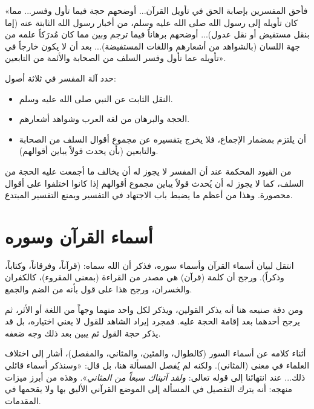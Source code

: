  «فأحق المفسرين بإصابة الحق في تأويل القرآن... أوضحهم حجة فيما تأول وفسر... مما كان تأويله إلى رسول الله صلى الله عليه وسلم، من أخبار رسول الله الثابتة عنه (إما بنقل مستفيض أو نقل عدول)... أوضحهم برهاناً فيما ترجم وبين مما كان مُدرَكاً علمه من جهة اللسان (بالشواهد من أشعارهم واللغات المستفيضة)... بعد أن لا يكون خارجاً في تأويله عما تأول وفسر السلف من الصحابة والأئمة من التابعين».

\begin{fawaid}
حدد  آلة المفسر في ثلاثة أصول:
\begin{itemize}
    \item النقل الثابت عن النبي صلى الله عليه وسلم.
    \item الحجة والبرهان من لغة العرب وشواهد أشعارهم.
    \item أن يلتزم بمضمار الإجماع، فلا يخرج بتفسيره عن مجموع أقوال السلف من الصحابة والتابعين (بأن يحدث قولاً يباين أقوالهم).
\end{itemize}
\end{fawaid}

\begin{fawaid}
من القيود المحكمة عند  أن المفسر لا يجوز له أن يخالف ما أجمعت عليه الحجة من السلف، كما لا يجوز له أن يُحدث قولاً يباين مجموع أقوالهم إذا كانوا اختلفوا على أقوال محصورة. وهذا من أعظم ما يضبط باب الاجتهاد في التفسير ويمنع التفسير المبتدع.
\end{fawaid}

\separator

\section{أسماء القرآن وسوره}
انتقل  لبيان أسماء القرآن وأسماء سوره، فذكر أن الله سماه: (قرآناً، وفرقاناً، وكتاباً، وذكراً).
ورجح أن كلمة (قرآن) هي مصدر من القراءة (بمعنى المقروء)، كالكفران والخسران، ورجح هذا على قول  بأنه من الضم والجمع.

ومن دقة صنيعه هنا أنه يذكر القولين، ويذكر لكل واحد منهما وجهاً من اللغة أو الأثر، ثم يرجح أحدهما بعد إقامة الحجة عليه. فمجرد إيراد الشاهد للقول لا يعني اختياره، بل قد يذكر حجة القول ثم يبين بعد ذلك وجه ضعفه.

\begin{fawaid}
أثناء كلامه عن أسماء السور (كالطوال، والمئين، والمثاني، والمفصل)، أشار إلى اختلاف العلماء في معنى (المثاني). ولكنه لم يُفصل المسألة هنا، بل قال: «وسنذكر أسماء قائلي ذلك... عند انتهائنا إلى قوله تعالى: \textit{ولقد آتيناك سبعاً من المثاني}». وهذه من أبرز ميزات منهجه: أنه يترك التفصيل في المسألة إلى الموضع القرآني الأليق بها ولا يقحمها في المقدمات.
\end{fawaid}

